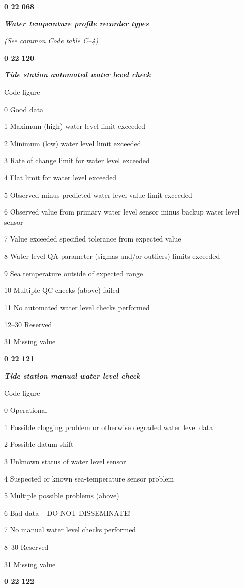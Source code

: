 \textbf{0 22 068}

\emph{\textbf{Water temperature profile recorder types}}

\emph{(See common Code table C--4)}

\textbf{0 22 120}

\emph{\textbf{Tide station automated water level check}}

Code figure

0 Good data

1 Maximum (high) water level limit exceeded

2 Minimum (low) water level limit exceeded

3 Rate of change limit for water level exceeded

4 Flat limit for water level exceeded

5 Observed minus predicted water level value limit exceeded

6 Observed value from primary water level sensor minus backup water level sensor

7 Value exceeded specified tolerance from expected value

8 Water level QA parameter (sigmas and/or outliers) limits exceeded

9 Sea temperature outside of expected range

10 Multiple QC checks (above) failed

11 No automated water level checks performed

12--30 Reserved

31 Missing value

\textbf{0 22 121}

\emph{\textbf{Tide station manual water level check}}

Code figure

0 Operational

1 Possible clogging problem or otherwise degraded water level data

2 Possible datum shift

3 Unknown status of water level sensor

4 Suspected or known sea-temperature sensor problem

5 Multiple possible problems (above)

6 Bad data -- DO NOT DISSEMINATE!

7 No manual water level checks performed

8--30 Reserved

31 Missing value

\textbf{0 22 122}

